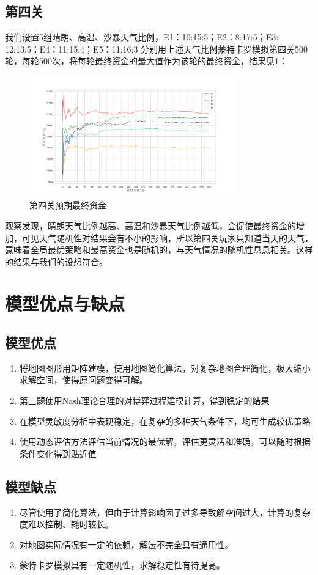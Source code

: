 \documentclass[withoutpre]{cumcmthesis} %
\begin{document}
\subsection{第四关}
我们设置5组晴朗、高温、沙暴天气比例，E1：10:15:5；E2：8:17:5；E3: 12:13:5；E4：11:15:4；E5：11:16:3
分别用上述天气比例蒙特卡罗模拟第四关500轮，每轮500次，将每轮最终资金的最大值作为该轮的最终资金，结果见\cref{fig:analysis4}：
\begin{figure}[H]
    \centering
    \includegraphics[width=0.8\textwidth]{figures/anaysis4.png}
    \caption{第四关预期最终资金}
    \label{fig:analysis4}
\end{figure}
观察发现，晴朗天气比例越高、高温和沙暴天气比例越低，会促使最终资金的增加，可见天气随机性对结果会有不小的影响，所以第四关玩家只知道当天的天气，意味着全局最优策略和最高资金也是随机的，与天气情况的随机性息息相关。这样的结果与我们的设想符合。

\section{模型优点与缺点}
\subsection{模型优点}
\begin{enumerate}
    \item 将地图图形用矩阵建模，使用地图简化算法，对复杂地图合理简化，极大缩小求解空间，使得原问题变得可解。
    \item 第三题使用Nash理论合理的对博弈过程建模计算，得到稳定的结果
    \item 在模型灵敏度分析中表现稳定，在复杂的多种天气条件下，均可生成较优策略
    \item 使用动态评估方法评估当前情况的最优解，评估更灵活和准确，可以随时根据条件变化得到贴近值
\end{enumerate}

\subsection{模型缺点}
\begin{enumerate}
    \item 尽管使用了简化算法，但由于计算影响因子过多导致解空间过大，计算的复杂度难以控制、耗时较长。
    \item 对地图实际情况有一定的依赖，解法不完全具有通用性。
    \item 蒙特卡罗模拟具有一定随机性，求解稳定性有待提高。
\end{enumerate}
\end{document}
